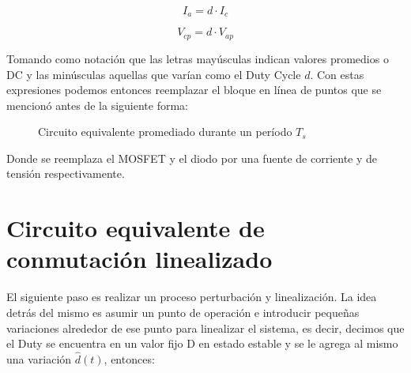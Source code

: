 \documentclass[12pt]{report}
\begin{document}
	\begin{equation}
		I_a = d \cdot I_c
		\label{equ:averaged_buck_current}
	\end{equation}
	
	\begin{equation}
		V_{cp} = d \cdot V_{ap}
		\label{equ:averaged_buck_voltage}
	\end{equation}
	
	Tomando como notación que las letras mayúsculas indican valores promedios o DC y las minúsculas aquellas que varían como el Duty Cycle $d$. Con estas expresiones podemos entonces reemplazar el bloque en línea de puntos que se mencionó antes de la siguiente forma:
	
	\begin{figure}[H]
		\centering
		\hfill
		\caption{Circuito equivalente promediado durante un período $T_s$}
	\end{figure}

	Donde se reemplaza el MOSFET y el diodo por una fuente de corriente y de tensión respectivamente. 
	
\section{Circuito equivalente de conmutación linealizado}

	El siguiente paso es realizar un proceso perturbación y linealización. La idea detrás del mismo es asumir un punto de operación e introducir pequeñas variaciones alrededor de ese punto para linealizar el sistema, es decir, decimos que el Duty se encuentra en un valor fijo D en estado estable y se le agrega al mismo una variación $\hat{d}(t)$, entonces:
	
\end{document}
